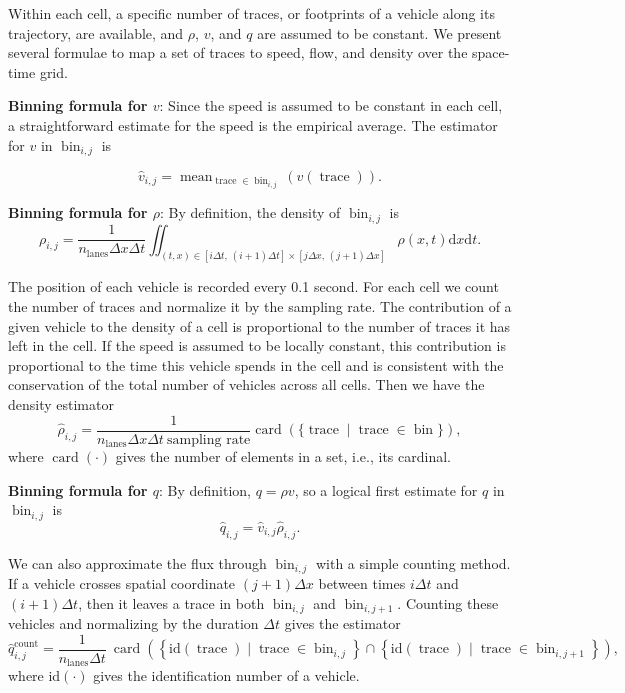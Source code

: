 \documentclass[preprint]{elsarticle}
\DeclareMathOperator{\card}{card}
\DeclareMathOperator{\trc}{trace}
\DeclareMathOperator{\mean}{mean}
\DeclareMathOperator{\bin}{bin}
\DeclareMathOperator{\lns}{lanes}
\DeclareMathOperator{\cnt}{count}
\begin{document}
Within each cell, a specific number of traces, or footprints of a vehicle along its trajectory, are available, and $\rho$, $v$, and $q$ are assumed to be constant. We present several formulae to map a set of traces to speed, flow, and density over the space-time grid. 

\textbf{Binning formula for $v$}: Since the speed is assumed to be constant in each cell, a straightforward estimate for the speed is the empirical average. The estimator for $v$ in $\bin_{i,j}$ is

\begin{equation}
\widehat{v}_{i,j}=\mean_{\trc \in \bin_{i,j}}(v(\trc)).
\end{equation}

\textbf{Binning formula for $\rho$}: By definition, the density of $\bin_{i,j}$ is  
\begin{equation}
\rho_{i,j}=\frac{1}{n_{\lns}\Delta x\Delta t}\iint_{\left(t,x\right)\in [i\Delta t, \,(i+1)\Delta t] \times [j\Delta x,\,(j+1)\Delta x]}\rho(x,t) \text{d}x \text{d}t.
\end{equation}

The position of each vehicle is recorded every 0.1 second. For each cell we count the number of traces and normalize it by the sampling rate. The contribution of a given vehicle to the density of a cell is proportional to the number of traces it has left in the cell. If the speed is assumed to be locally constant, this contribution is proportional to the time this vehicle spends in the cell and is consistent with the conservation of the total number of vehicles across all cells. Then we have the density estimator
\begin{equation}
\widehat{\rho}_{i,j}=\frac{1}{n_{\lns} \Delta x \Delta t \: \text{sampling rate}}\card ( \{ \trc \mid \trc \in \bin \} ),
\end{equation}
where $\card (\cdot)$ gives the number of elements in a set, i.e., its cardinal. 

\textbf{Binning formula for $q$}: By definition, $q=\rho v$, so a logical first estimate for $q$ in $\bin_{i,j}$ is 
\begin{equation}
\widehat{q}_{i,j}=\widehat{v}_{i,j}\widehat{\rho}_{i,j}.
\end{equation}

We can also approximate the flux through $\bin_{i,j}$ with a simple counting method. If a vehicle crosses spatial coordinate $\left(j+1\right)\Delta x$ between times $i\Delta t$ and $\left(i+1\right)\Delta t$, then it leaves a trace in both $\bin_{i,j}$ and $\bin_{i,j+1}$. Counting these vehicles and normalizing by the duration $\Delta t$ gives the estimator
\begin{equation}
\widehat{q}_{i,j}^{\cnt}=\frac{1}{n_{\lns}\Delta t}\: \card\left(\left\{ \text{id} \left(\trc\right)\mid \trc \in \bin_{i,j}\right\} \cap\left\{ \text{id}\left( \trc \right)\mid \trc\in \bin_{i,j+1}\right\} \right),
\end{equation}
where id$(\cdot)$ gives the identification number of a vehicle.
\end{document}
